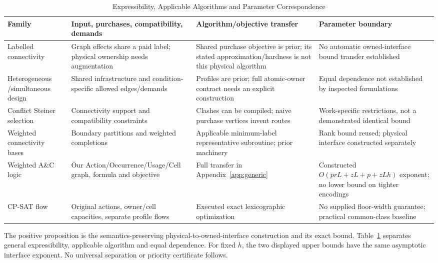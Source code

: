 \begin{table}[t]
\caption{Expressibility, Applicable Algorithms and Parameter Correspondence}\label{tab:boundary}
\centering\footnotesize\setlength{\tabcolsep}{3pt}
\begin{tabular}{p{}p{}p{}p{}}
\toprule Family & Input, purchases, compatibility, demands & Algorithm/objective transfer & Parameter boundary \\\midrule
Labelled connectivity~\cite{labels} & Graph effects share a paid label; physical ownership needs augmentation & Shared purchase objective is prior; its stated approximation/hardness is not this physical algorithm & No automatic owned-interface bound transfer established\\
Heterogeneous /\newline simultaneous design~\cite{condition,simultaneous} & Shared infrastructure and condition-specific allowed edges/demands & Profiles are prior; full atomic-owner contract needs an explicit construction & Equal dependence not established by inspected formulations\\
Conflict Steiner selection~\cite{conflicts} & Connectivity support and compatibility constraints & Clashes can be compiled; naive purchase vertices invent routes & Work-specific restrictions, not a demonstrated identical bound\\
Weighted connectivity bases~\cite{rank} & Boundary partitions and weighted completions & Applicable minimum-label representative subroutine; prior machinery & Rank bound reused; physical interface constructed separately\\
Weighted A\&C logic~\cite{logic} & Our Action/Occurrence/Usage/Cell graph, formula and objective & Full transfer in Appendix~\ref{app:generic} & Constructed $O(prL+zL+p+zLh)$ exponent; no lower bound on tighter encodings\\
CP-SAT flow~\cite{cpsat} & Original actions, owner/cell capacities, separate profile flows & Executed exact lexicographic optimization & No supplied floor-width guarantee; practical common-class baseline\\
\bottomrule\end{tabular}\end{table}
The positive proposition is the semantics-preserving physical-to-owned-interface construction and its exact bound. Table~\ref{tab:boundary} separates general expressibility, applicable algorithm and equal dependence. For fixed $h$, the two displayed upper bounds have the same asymptotic interface exponent. No universal separation or priority certificate follows.

